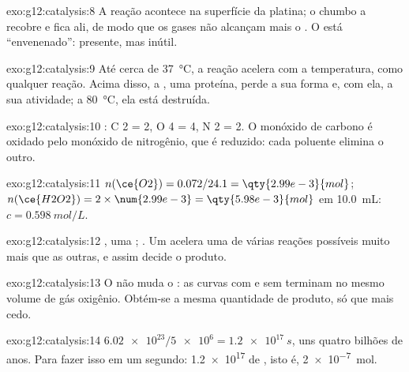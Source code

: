 \begin{solution}{exo:g12:catalysis:8}
A reação acontece na superfície da platina; o chumbo a recobre e fica
ali, de modo que os gases não alcançam mais o . O  está
``envenenado'': presente, mas inútil.
\end{solution}

\begin{solution}{exo:g12:catalysis:9}
Até cerca de \qty{37}{\celsius}, a reação acelera com a temperatura,
como qualquer reação. Acima disso, a , uma proteína, perde a sua
forma e, com ela, a sua atividade; a \qty{80}{\celsius}, ela está
destruída.
\end{solution}

\begin{solution}{exo:g12:catalysis:10}
: C 2 = 2, O 4 = 4, N 2 = 2. O monóxido de
carbono é oxidado pelo monóxido de nitrogênio, que é reduzido: cada
poluente elimina o outro.
\end{solution}

\begin{solution}{exo:g12:catalysis:11}
$n(\ce{O2}) = 0.072 / 24.1 = \qty{2.99e-3}{mol}$;
$n(\ce{H2O2}) = 2 \times \num{2.99e-3} = \qty{5.98e-3}{mol}$ em
\qty{10.0}{mL}: $c = \qty{0.598}{mol/L}$.
\end{solution}

\begin{solution}{exo:g12:catalysis:12}
, uma ; .
Um  acelera uma de várias reações possíveis muito
mais que as outras, e assim decide o produto.
\end{solution}

\begin{solution}{exo:g12:catalysis:13}
O  não muda o : as curvas com e sem 
terminam no mesmo volume de gás oxigênio. Obtém-se a mesma quantidade de
produto, só que mais cedo.
\end{solution}

\begin{solution}{exo:g12:catalysis:14}
$\num{6.02e23} / \num{5e6} = \qty{1.2e17}{s}$, uns quatro bilhões de
anos. Para fazer isso em um segundo: \num{1.2e17}  de ,
isto é, \qty{2e-7}{mol}.
\end{solution}

